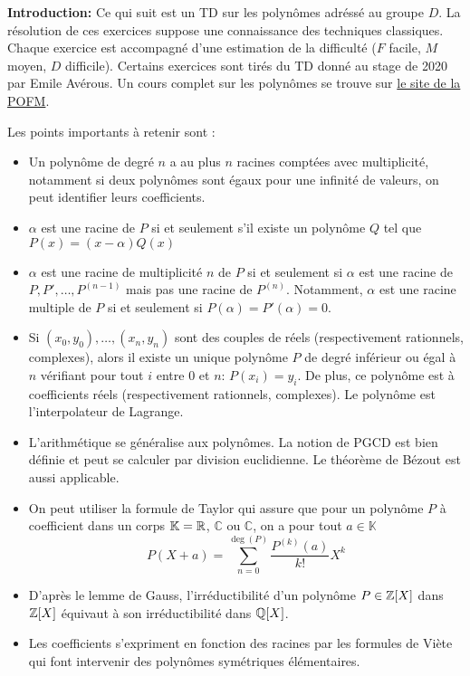 \textbf{Introduction:} Ce qui suit est un TD sur les polynômes adréssé au groupe $D$. La résolution de ces exercices suppose une connaissance des techniques classiques. Chaque exercice est accompagné d'une estimation de la difficulté ($F$ facile, $M$ moyen, $D$ difficile). Certains exercices sont tirés du TD donné au stage de 2020 par Emile Avérous. Un cours complet sur les polynômes se trouve sur \href{https://maths-olympiques.fr/wp-content/uploads/2017/09/polynomes.pdf}{le site de la POFM}.

Les points importants à retenir sont :
\begin{itemize}
    \item Un polynôme de degré $n$ a au plus $n$ racines comptées avec multiplicité, notamment si deux polynômes sont égaux pour une infinité de valeurs, on peut identifier leurs coefficients.
    \item $\alpha$ est une racine de $P$ si et seulement s'il existe un polynôme $Q$ tel que $P(x)=(x-\alpha)Q(x)$
    \item $\alpha$ est une racine de multiplicité $n$ de $P$ si et seulement si $\alpha$ est une racine de $P,P',\ldots,P^{(n-1)}$ mais pas une racine de $P^{(n)}$. Notamment, $\alpha$ est une racine multiple de $P$ si et seulement si $P(\alpha)=P'(\alpha)=0$.
    \item Si $(x_0,y_0),\ldots,(x_n,y_n)$ sont des couples de réels (respectivement rationnels, complexes), alors il existe un unique polynôme $P$ de degré inférieur ou égal à $n$ vérifiant pour tout $i$ entre $0$ et $n$: $P(x_i)=y_i$. De plus, ce polynôme est à coefficients réels (respectivement rationnels, complexes). Le polynôme est l'interpolateur de Lagrange.
    \item L'arithmétique se généralise aux polynômes. La notion de PGCD est bien définie et peut se calculer par division euclidienne. Le théorème de Bézout est aussi applicable.
    \item On peut utiliser la formule de Taylor qui assure que pour un polynôme $P$ à coefficient dans un corps $\mathbb{K}=\mathbb R$, $\mathbb{C}$ ou $\mathbb{C}$, on a pour tout $a\in \mathbb{K}$
    $$P(X+a)=\sum_{n=0}^{\deg(P)}\frac{P^{(k)}(a)}{k!}X^k $$
    \item D'après le lemme de Gauss, l'irréductibilité d'un polynôme $P\in \mathbb Z[X]$ dans $\mathbb Z[X]$ équivaut à son irréductibilité dans $\mathbb Q[X]$.
    \item Les coefficients s'expriment en fonction des racines par les formules de Viète qui font intervenir des polynômes symétriques élémentaires.
\end{itemize}


